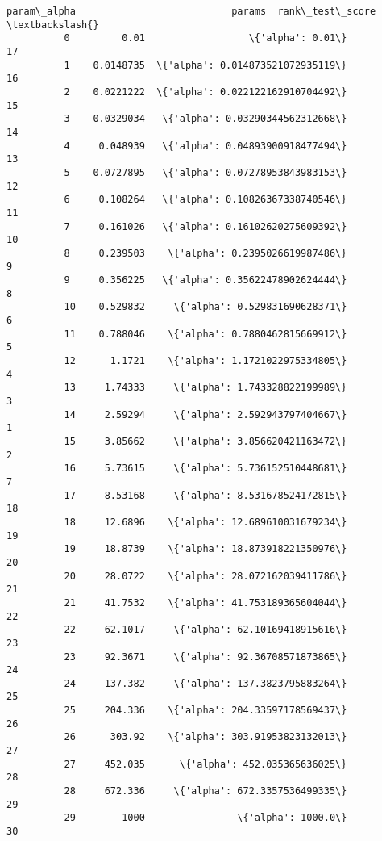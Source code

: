 \documentclass[11pt]{article}
\begin{document}
\begin{Verbatim}[commandchars=\\\{\}]
             param\_alpha                           params  rank\_test\_score  \textbackslash{}
          0         0.01                  \{'alpha': 0.01\}               17   
          1    0.0148735  \{'alpha': 0.014873521072935119\}               16   
          2    0.0221222  \{'alpha': 0.022122162910704492\}               15   
          3    0.0329034   \{'alpha': 0.03290344562312668\}               14   
          4     0.048939   \{'alpha': 0.04893900918477494\}               13   
          5    0.0727895   \{'alpha': 0.07278953843983153\}               12   
          6     0.108264   \{'alpha': 0.10826367338740546\}               11   
          7     0.161026   \{'alpha': 0.16102620275609392\}               10   
          8     0.239503    \{'alpha': 0.2395026619987486\}                9   
          9     0.356225   \{'alpha': 0.35622478902624444\}                8   
          10    0.529832     \{'alpha': 0.529831690628371\}                6   
          11    0.788046    \{'alpha': 0.7880462815669912\}                5   
          12      1.1721    \{'alpha': 1.1721022975334805\}                4   
          13     1.74333     \{'alpha': 1.743328822199989\}                3   
          14     2.59294     \{'alpha': 2.592943797404667\}                1   
          15     3.85662     \{'alpha': 3.856620421163472\}                2   
          16     5.73615     \{'alpha': 5.736152510448681\}                7   
          17     8.53168     \{'alpha': 8.531678524172815\}               18   
          18     12.6896    \{'alpha': 12.689610031679234\}               19   
          19     18.8739    \{'alpha': 18.873918221350976\}               20   
          20     28.0722    \{'alpha': 28.072162039411786\}               21   
          21     41.7532    \{'alpha': 41.753189365604044\}               22   
          22     62.1017     \{'alpha': 62.10169418915616\}               23   
          23     92.3671     \{'alpha': 92.36708571873865\}               24   
          24     137.382     \{'alpha': 137.3823795883264\}               25   
          25     204.336    \{'alpha': 204.33597178569437\}               26   
          26      303.92    \{'alpha': 303.91953823132013\}               27   
          27     452.035      \{'alpha': 452.035365636025\}               28   
          28     672.336     \{'alpha': 672.3357536499335\}               29   
          29        1000                \{'alpha': 1000.0\}               30   
          

\end{Verbatim}
\end{document}
